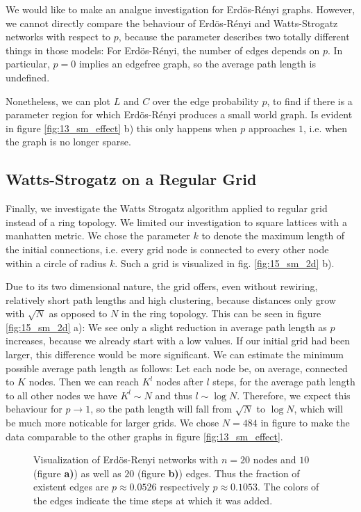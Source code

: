 \documentclass{scrartcl}
\begin{document}
We would like to make an analgue investigation for Erdös-Rényi graphs. However, we cannot directly compare the behaviour of Erdös-Rényi and Watts-Strogatz networks with respect to $p$, because the parameter describes two totally different things in those models: For Erdös-Rényi, the number of edges depends on $p$. In particular, $p=0$ implies an edgefree graph, so the average path length is undefined. 

Nonetheless, we can plot $L$ and $C$ over the edge probability $p$, to find if there is a parameter region for which Erdös-Rényi produces a small world graph. Is evident in figure \ref{fig:13_sm_effect} b) this only happens when $p$ approaches $1$, i.e. when the graph is no longer sparse.

\subsection{Watts-Strogatz on a Regular Grid}
Finally, we investigate the Watts Strogatz algorithm applied to regular grid instead of a ring topology. We limited our investigation to square lattices with a manhatten metric. We chose the parameter $k$ to denote the maximum length of the initial connections, i.e. every grid node is connected to every other node within a circle of radius $k$. Such a grid is visualized in fig. \ref{fig:15_sm_2d} b). 

Due to its two dimensional nature, the grid offers, even without rewiring, relatively short path lengths and high clustering, because distances only grow with $\sqrt{N}$ as opposed to $N$ in the ring topology. This can be seen in figure \ref{fig:15_sm_2d} a): We see only a slight reduction in average path length as $p$ increases, because we already start with a low values. If our initial grid had been larger, this difference would be more significant. We can estimate the minimum possible average path length as follows:
Let each node be, on average, connected to $K$ nodes. Then we can reach $K^l$ nodes after $l$ steps, for the average path length to all other nodes we have $K^l \sim N$ and thus $l \sim \log N$. Therefore, we expect this behaviour for $p \rightarrow 1$, so the path length will fall from $\sqrt{N}$ to $\log N$, which will be much more noticable for larger grids. We chose $N=484$ in figure to make the data comparable to the other graphs in figure \ref{fig:13_sm_effect}. 

\begin{figure}
    \centering
    \def\svgwidth{0.8\columnwidth}
    
    \caption{Visualization of Erdös-Renyi networks with $n=20$ nodes and $10$ (figure \textbf{a)}) as well as $20$ (figure \textbf{b)})
        edges. Thus the fraction of existent edges are $p \approx 0.0526$
        respectively $p \approx 0.1053$. The colors of the edges indicate the time
        steps at which it was added.}
    \label{11_er}
\end{figure}
\end{document}
